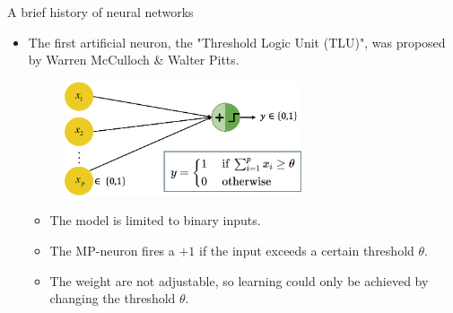 







\begin{vbframe}{A brief history of neural networks}
\begin{itemize}
\item {} The first artificial neuron, the "Threshold Logic Unit (TLU)", was proposed by Warren McCulloch \& Walter Pitts.
\begin{figure}
\includegraphics[width=7cm]{figure/mp_neuron.png}
\end{figure}
\begin{itemize}
\item The model is limited to binary inputs.
\vspace{2mm}
\item The MP-neuron fires a $+1$ if the input exceeds a certain threshold $\theta$.
\vspace{2mm}
\item The weight are not adjustable, so learning could only be achieved by changing the threshold $\theta$.
\end{itemize}
\end{itemize}
\framebreak


\end{vbframe}
